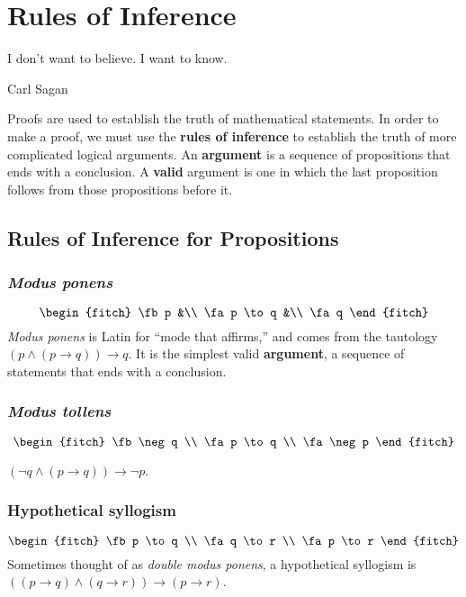 \chapter{Rules of Inference}
  \epigraph{I don't want to believe. I want to know.}
{Carl Sagan}
Proofs are used to establish the truth of mathematical statements. In order to
make a proof, we must use the \textbf{rules of inference} to establish the truth of more complicated logical arguments. An
\textbf{argument} is a sequence of propositions that ends with a conclusion. A
\textbf{valid} argument is one in which the last proposition follows from those
propositions before it.

\section{Rules of Inference for Propositions}

\subsection{\emph{Modus ponens}}\label{modus_ponens}
\begin{equation*}
  \begin{fitch}
    \fb p       &\\
    \fa p \to q &\\
    \fa  q
  \end{fitch}
\end{equation*}
\emph{Modus ponens} is Latin for ``mode that affirms,'' and comes from the
tautology $(p \wedge (p \to q)) \to q$. It is the simplest valid
\textbf{argument}, a sequence of statements that ends with a conclusion.

\subsection{\emph{Modus tollens}}
\begin{equation*}
  \begin{fitch}
    \fb \neg q \\
    \fa p \to q \\
    \fa \neg p
  \end{fitch}
\end{equation*}

$(\neg q \wedge (p \to q)) \to \neg p$.

\subsection{Hypothetical syllogism}
\begin{equation*}
  \begin{fitch}
    \fb p \to q \\
    \fa q \to r \\
    \fa p \to r
  \end{fitch}
\end{equation*}
Sometimes thought of as \emph{double modus ponens}, a hypothetical syllogism is
$((p \to q) \wedge (q \to r)) \to (p \to r)$.

